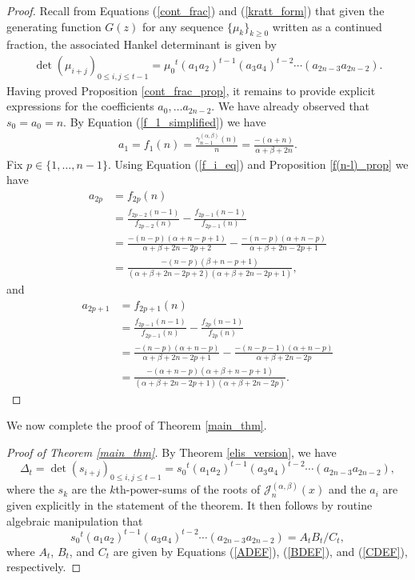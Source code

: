 \documentclass[10pt,a4paper]{amsart}
\begin{document}
\begin{proof}
Recall from Equations (\ref{cont_frac}) and (\ref{kratt_form}) that given the generating function $G(z)$ for any sequence $\lbrace \mu_k \rbrace_{k \geq 0}$ written as a continued fraction, the associated Hankel determinant is given by
\begin{align} \label{det_form_defn}
    \det(\mu_{i+j})_{0\le i,j\le t-1}={\mu_0}^t(a_1a_2)^{t-1}
   (a_3a_4)^{t-2}\cdots(a_{2n-3}a_{2n-2}).
\end{align}
Having proved Proposition \ref{cont_frac_prop}, it remains to provide explicit expressions for the coefficients $a_0,\ldots a_{2n-2}$.  We have already observed that $s_0 = a_0 = n$.  By  Equation (\ref{f_1_simplified}) we have
\begin{align*}
    a_1=f_1(n)=\frac{\gamma_{n-1}^{(\alpha,\beta)}(n)}{n}=\frac{-(\alpha+n)}{\alpha+\beta+2n}.
\end{align*}
Fix $p\in\{1,\ldots,n-1\}$. Using Equation (\ref{f_i_eq}) and Proposition \ref{f(n-l)_prop} we have
\begin{align*}
    a_{2p}&=f_{2p}(n)\\
    &=\frac{f_{2p-2}(n-1)}{f_{2p-2}(n)}-\frac{f_{2p-1}(n-1)}{f_{2p-1}(n)}\\
    &=\frac{-(n-p)(\alpha+n-p+1)}{\alpha+\beta+2n-2p+2}-\frac{-(n-p)(\alpha+n-p)}{\alpha+\beta+2n-2p+1}\\
    &=\frac{-(n-p)(\beta+n-p+1)}{(\alpha+\beta+2n-2p+2)(\alpha+\beta+2n-2p+1)},
\end{align*}
and
\begin{align*}
    a_{2p+1}&=f_{2p+1}(n)\\
    &=\frac{f_{2p-1}(n-1)}{f_{2p-1}(n)}-\frac{f_{2p}(n-1)}{f_{2p}(n)}\\
    &=\frac{-(n-p)(\alpha+n-p)}{\alpha+\beta+2n-2p+1}-\frac{-(n-p-1)(\alpha+n-p)}{\alpha+\beta+2n-2p}\\
    &=\frac{-(\alpha+n-p)(\alpha+\beta+n-p+1)}{(\alpha+\beta+2n-2p+1)(\alpha+\beta+2n-2p)}.
\end{align*}
\end{proof}


We now complete the proof of Theorem \ref{main_thm}.

\begin{proof}[Proof of Theorem \ref{main_thm}]
By Theorem \ref{elis_version}, we have
\[
\Delta_{t} = \det (s_{i+j})_{0 \leq i,j \leq t-1} = {s_0}^t(a_1a_2)^{t-1}(a_3a_4)^{t-2}\cdots(a_{2n-3}a_{2n-2}),
\]
where the $s_{k}$ are the $k$th-power-sums of the roots of $\mathscr{J}_n^{(\alpha,\beta)}(x)$ and the $a_i$ are given explicitly in the statement of the theorem.  It then follows by routine algebraic manipulation that 
\[
{s_0}^t(a_1a_2)^{t-1}(a_3a_4)^{t-2}\cdots(a_{2n-3}a_{2n-2}) = A_{t}B_{t}/C_{t},
\]
where $A_{t}$, $B_{t}$, and $C_{t}$ are given by Equations (\ref{ADEF}), (\ref{BDEF}), and (\ref{CDEF}), respectively.  
\end{proof}
\end{document}
